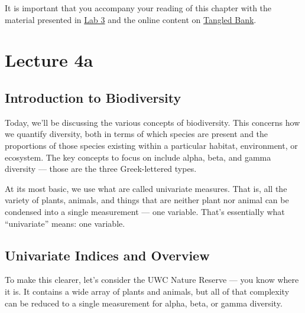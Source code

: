 \documentclass[
  11pt,
]{book}
\begin{document}
\begin{tcolorbox}[enhanced jigsaw, arc=.35mm, titlerule=0mm, colframe=quarto-callout-note-color-frame, title=\textcolor{quarto-callout-note-color}{\faInfo}\hspace{0.5em}{Also see:}, colbacktitle=quarto-callout-note-color!10!white, opacityback=0, rightrule=.15mm, coltitle=black, left=2mm, bottomtitle=1mm, toptitle=1mm, toprule=.15mm, bottomrule=.15mm, leftrule=.75mm, opacitybacktitle=0.6, colback=white, breakable]

It is important that you accompany your reading of this chapter with the
material presented in \href{Lab-03-biodiversity.html}{Lab 3} and the
online content on \href{Lec-04-biodiversity.html}{Tangled Bank}.

\end{tcolorbox}

\chapter*{Lecture 4a}\label{lecture-4a}

\section{Introduction to
Biodiversity}\label{introduction-to-biodiversity}

Today, we'll be discussing the various concepts of biodiversity. This
concerns how we quantify diversity, both in terms of which species are
present and the proportions of those species existing within a
particular habitat, environment, or ecosystem. The key concepts to focus
on include alpha, beta, and gamma diversity --- those are the three
Greek-lettered types.

At its most basic, we use what are called univariate measures. That is,
all the variety of plants, animals, and things that are neither plant
nor animal can be condensed into a single measurement --- one variable.
That's essentially what ``univariate'' means: one variable.

\section{Univariate Indices and
Overview}\label{univariate-indices-and-overview}

To make this clearer, let's consider the UWC Nature Reserve --- you know
where it is. It contains a wide array of plants and animals, but all of
that complexity can be reduced to a single measurement for alpha, beta,
or gamma diversity.
\end{document}
